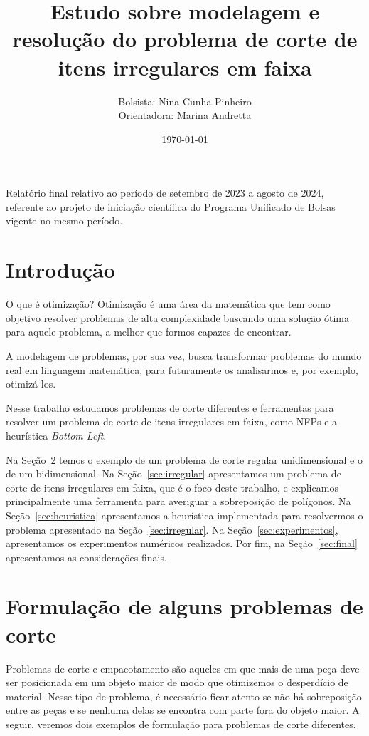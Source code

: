 \documentclass{article}
\title{Estudo sobre modelagem e resolução do problema de corte de itens irregulares em faixa}
\author{Bolsista: Nina  Cunha Pinheiro\\ Orientadora: Marina Andretta}
\date{\today}
\begin{document}
\maketitle

\begin{center}
Relatório final relativo ao período de setembro de 2023 a agosto de 2024, referente ao projeto de iniciação científica do Programa Unificado de Bolsas vigente no mesmo período. 
\end{center}

\section{Introdução}

O que é otimização? Otimização é uma área da matemática que tem como objetivo resolver problemas de alta complexidade buscando uma solução ótima para aquele problema, a melhor que formos capazes de encontrar.

A modelagem de problemas, por sua vez, busca transformar problemas do mundo real em linguagem matemática, para futuramente os analisarmos e, por exemplo, otimizá-los.

Nesse trabalho estudamos problemas de corte diferentes e ferramentas para resolver um problema de corte de itens irregulares em faixa, como NFPs e a heurística {\it Bottom-Left}.

Na Seção~\ref{sec:outros} temos o exemplo de um problema de corte regular unidimensional e o de um bidimensional. Na Seção~\ref{sec:irregular} apresentamos um problema de corte de itens irregulares em faixa, que é o foco deste trabalho, e explicamos principalmente uma ferramenta para averiguar a sobreposição de polígonos. Na Seção~\ref{sec:heuristica} apresentamos a heurística implementada para resolvermos o problema apresentado na Seção~\ref{sec:irregular}. Na Seção~\ref{sec:experimentos}, apresentamos os experimentos numéricos realizados. Por fim, na Seção~\ref{sec:final} apresentamos as considerações finais.


\section{Formulação de alguns problemas de corte} \label{sec:outros}

Problemas de corte e empacotamento são aqueles em que mais de uma peça deve ser posicionada em um objeto maior de modo que otimizemos o desperdício de material. Nesse tipo de problema, é necessário ficar atento se não há sobreposição entre as peças e se nenhuma delas se encontra com parte fora do objeto maior. A seguir, veremos dois exemplos de formulação para problemas de corte diferentes.
\end{document}
